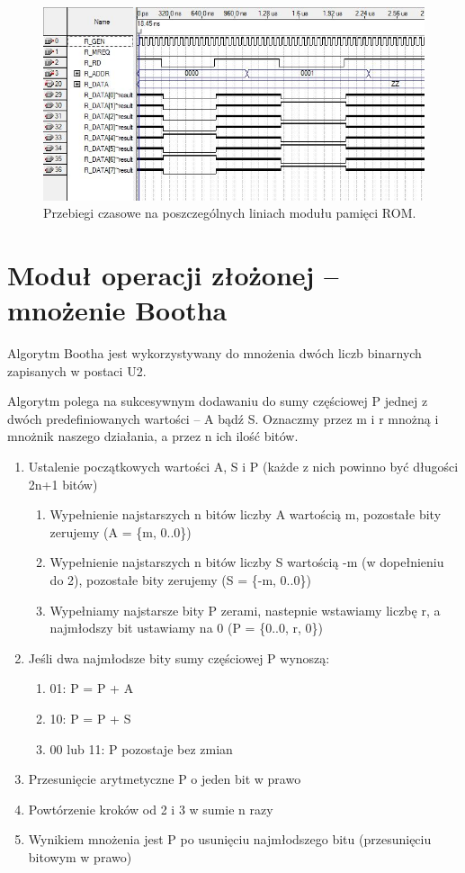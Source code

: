 \documentclass[a4paper,12pt]{report}
\begin{document}
\begin{figure}[h]
\centering
\includegraphics[width=15cm]{./pict/rom.jpg}
\caption{Przebiegi czasowe na poszczególnych liniach modułu pamięci ROM.}
\label{fig:rom}
\end{figure}

\section{Moduł operacji złożonej -- mnożenie Bootha}

Algorytm Bootha jest wykorzystywany do mnożenia dwóch liczb binarnych zapisanych w postaci U2.

Algorytm polega na sukcesywnym dodawaniu do sumy częściowej P jednej z dwóch predefiniowanych wartości -- A bądź S. Oznaczmy przez m i r mnożną i mnożnik naszego działania, a przez n ich ilość bitów.

\begin{enumerate}
  \item Ustalenie początkowych wartości A, S i P (każde z nich powinno być długości 2n+1 bitów)
  \begin{enumerate}
    \item Wypełnienie najstarszych n bitów liczby A wartością m, pozostałe bity zerujemy (A = \{m, 0..0\})
    \item Wypełnienie najstarszych n bitów liczby S wartością -m (w dopełnieniu do 2), pozostałe bity zerujemy (S = \{-m, 0..0\})
    \item Wypełniamy najstarsze bity P zerami, nastepnie wstawiamy liczbę r, a najmłodszy bit ustawiamy na 0 (P = \{0..0, r, 0\})
  \end{enumerate}
  \item Jeśli dwa najmłodsze bity sumy częściowej P wynoszą:
  \begin{enumerate}
    \item 01: P = P + A
    \item 10: P = P + S
    \item 00 lub 11: P pozostaje bez zmian
  \end{enumerate}
  \item Przesunięcie arytmetyczne P o jeden bit w prawo
  \item Powtórzenie kroków od 2 i 3 w sumie n razy
  \item Wynikiem mnożenia jest P po usunięciu najmłodszego bitu (przesunięciu bitowym w prawo)
\end{enumerate}
\end{document}
